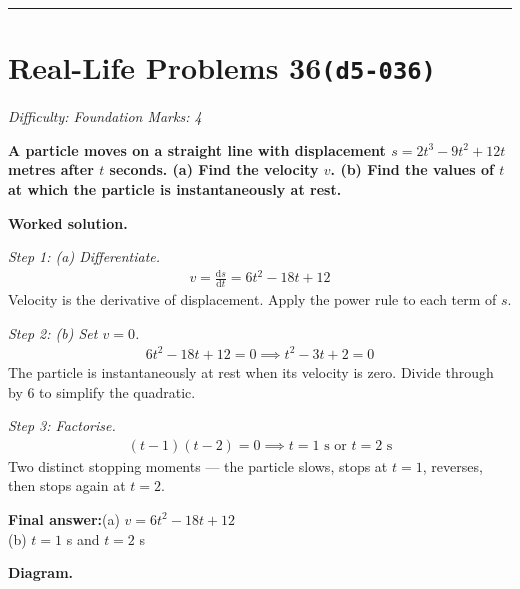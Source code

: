 \documentclass[11pt]{article}
\newcommand{\question}[1]{\par\medskip\noindent\textbf{#1}\par}
\begin{document}
\medskip\hrule

\section*{Real-Life Problems 36\quad\small\texttt{(d5-036)}}
\textit{Difficulty: Foundation \quad\textbar\quad Marks: 4}

\question{A particle moves on a straight line with displacement \( s = 2t^3 - 9t^2 + 12t \) metres after \( t \) seconds. (a) Find the velocity \( v \). (b) Find the values of \( t \) at which the particle is instantaneously at rest.}

\textbf{Worked solution.}

\textit{Step 1: (a) Differentiate.}
\[\begin{gathered}
v = \frac{\mathrm{d}s}{\mathrm{d}t} = 6t^2 - 18t + 12
\end{gathered}\]
Velocity is the derivative of displacement. Apply the power rule to each term of \( s \).

\textit{Step 2: (b) Set \( v = 0 \).}
\[\begin{gathered}
6t^2 - 18t + 12 = 0 \implies t^2 - 3t + 2 = 0
\end{gathered}\]
The particle is instantaneously at rest when its velocity is zero. Divide through by 6 to simplify the quadratic.

\textit{Step 3: Factorise.}
\[\begin{gathered}
(t-1)(t-2) = 0 \implies t = 1 \text{ s or } t = 2 \text{ s}
\end{gathered}\]
Two distinct stopping moments --- the particle slows, stops at \( t = 1 \), reverses, then stops again at \( t = 2 \).

\begin{answerbox}
\textbf{Final answer:}\quad (a) \(\displaystyle  v = 6t^2 - 18t + 12 \) \\[3pt]  (b) \(\displaystyle  t = 1 \) s and \(\displaystyle  t = 2 \) s
\end{answerbox}
\textbf{Diagram.}
\end{document}
